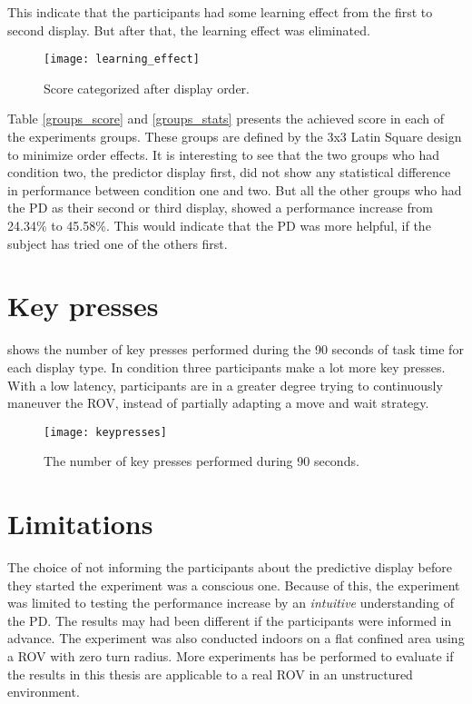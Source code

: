 This indicate that the participants had some learning effect from the first to second display. But after that, the learning effect was eliminated.

\begin{figure}[h!]
    \centering
    \texttt{[image: learning\_effect]}
    \caption{Score categorized after display order.}
    \label{learning_effect}
\end{figure}

\clearpage
Table \ref{groups_score} and \ref{groups_stats} presents the achieved score in each of the experiments groups. These groups are defined by the 3x3 Latin Square design to minimize order effects. It is interesting to see that the two groups who had condition two, the predictor display first, did not show any statistical difference in performance between condition one and two. But all the other groups who had the PD as their second or third display, showed a performance increase from 24.34\% to 45.58\%. This would indicate that the PD was more helpful, if the subject has tried one of the others first.




\clearpage
\section{Key presses}

 shows the number of key presses performed during the 90 seconds of task time for each display type. In condition three participants make a lot more key presses. With a low latency, participants are in a greater degree trying to continuously maneuver the ROV, instead of partially adapting a move and wait strategy.

\begin{figure}[h!]
    \centering
    \texttt{[image: keypresses]}
    \caption{The number of key presses performed during 90 seconds.}
    \label{keypresses}
    \vspace{-5mm}
\end{figure}

\section{Limitations}

The choice of not informing the participants about the predictive display before they started the experiment was a conscious one. Because of this, the experiment was limited to testing the performance increase by an \emph{intuitive} understanding of the PD. The results may had been different if the participants were informed in advance. The experiment was also conducted indoors on a flat confined area using a ROV with zero turn radius. More experiments has be performed to evaluate if the results in this thesis are applicable to a real ROV in an unstructured environment.
